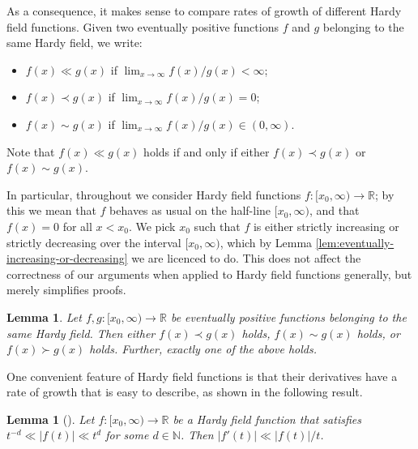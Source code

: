 \documentclass{amsart}
\newtheorem{lemma}[theorem]{Lemma}
\theoremstyle{definition}
\newcommand{\abs}[1]{\left|#1\right|}
\newcommand{\NN}{\mathbb{N}}
\newcommand{\RR}{\mathbb{R}}
\begin{document}
As a consequence, it makes sense to compare rates of growth of different Hardy field functions. Given two eventually positive functions $f$ and $g$ belonging to the same Hardy field, we write:
\begin{itemize}
\item $f(x) \ll g(x)$ if $\lim_{x \to \infty} f(x)/g(x) < \infty$;
\item $f(x) \prec g(x)$ if $\lim_{x \to \infty} f(x)/g(x) = 0$;
\item $f(x) \sim g(x)$ if $\lim_{x \to \infty} f(x)/g(x) \in (0,\infty)$.
\end{itemize}
Note that $f(x) \ll g(x)$ holds if and only if either $f(x) \prec g(x)$ or $f(x) \sim g(x)$.

In particular, throughout we consider Hardy field functions $f \colon [x_0, \infty) \to \RR$; by this we mean that $f$ behaves as usual on the half-line $[x_0, \infty)$, and that $f(x) = 0$ for all $x < x_0$. We pick $x_0$ such that $f$ is either strictly increasing or strictly decreasing over the interval $[x_0, \infty)$, which by Lemma \ref{lem:eventually-increasing-or-decreasing} we are licenced to do. This does not affect the correctness of our arguments when applied to Hardy field functions generally, but merely simplifies proofs.

\begin{lemma}
	Let $f,g \colon [x_0, \infty) \to \RR$ be eventually positive functions belonging to the same Hardy field. Then either $f(x) \prec g(x)$ holds, $f(x) \sim g(x)$ holds, or $f(x) \succ g(x)$ holds. Further, exactly one of the above holds.
\end{lemma}

One convenient feature of Hardy field functions is that their derivatives have a rate of growth that is easy to describe, as shown in the following result.

\begin{lemma}[{\cite[Lem.\ 2.1]{Frantzikinakis-2009}}]\label{lem:hardy:derivative}
Let $f \colon [x_0, \infty) \to \RR$ be a Hardy field function that satisfies $t^{-d} \ll \abs{f(t)} \ll t^d$ for some $d \in \NN$. Then $\abs{f'(t)} \ll \abs{f(t)}/t$.
\end{lemma}
\end{document}
